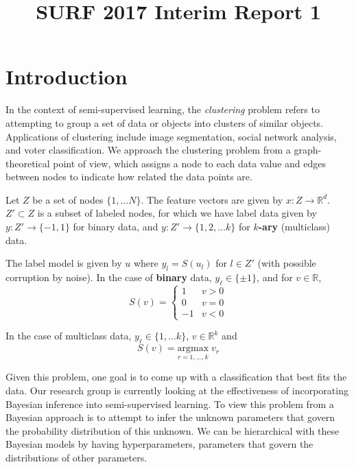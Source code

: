 \documentclass{siamart1116}
\title{SURF 2017 Interim Report 1}
\author{\TheAuthors}
\date{}
\begin{document}
\maketitle
\setlength{\unitlength}{1in}
\setlength{\parindent}{0in}

\section{Introduction}
In the context of semi-supervised learning, the \textit{clustering} problem refers to attempting to group a set of data or objects into clusters of similar objects. Applications of clustering include image segmentation, social network analysis, and voter classification. We approach the clustering problem from a graph-theoretical point of view, which assigns a node to each data value and edges between nodes to indicate how related the data points are.

Let $Z$ be a set of nodes $\{1, \ldots N\}$. The feature vectors are given by $x : Z \rightarrow \mathbb{R}^d$. $Z' \subset Z$ is a subset of labeled nodes, for which we have label data given by $y : Z' \to \{-1, 1\}$ for binary data, and $y : Z' \to \{1,2,\ldots k\}$ for {\bf $k$-ary} (multiclass) data.


The label model is given by $u$ where $y_l = S(u_l)$ for $l \in Z'$ (with possible corruption by noise). In the case of {\bf binary} data, $y_\ell \in \{\pm 1\}$, and for $v \in \mathbb{R}$,
\[
S(v) = \begin{cases}
1 & v>0\\
0 & v=0\\
-1 & v<0
\end{cases}
\]

In the case of multiclass data, $y_\ell \in \{1, \ldots k\}$, $v \in \mathbb{R}^k$ and
\[
S(v) = \underset{r =1,\ldots,k}{\mathrm{argmax}}\;v_r
\]

Given this problem, one goal is to come up with a classification that best fits the data. Our research group is currently looking at the effectiveness of incorporating Bayesian inference into semi-supervised learning. To view this problem from a Bayesian approach is to attempt to infer the unknown parameters that govern the probability distribution of this unknown. We can be hierarchical with these Bayesian models by having hyperparameters, parameters that govern the distributions of other parameters.
\end{document}
